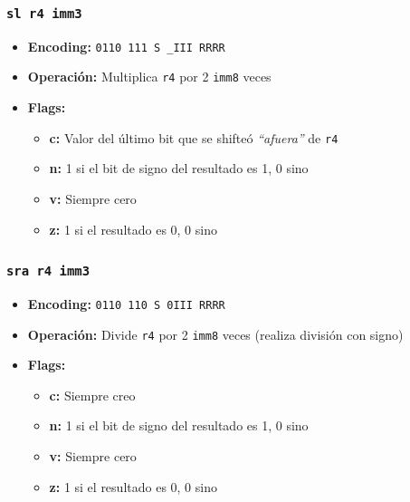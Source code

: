 \documentclass{article}
\begin{document}
\subsubsection{\texttt{sl r4 imm3}}
\begin{itemize}
    \item \textbf{Encoding:} \texttt{0110 111 S \_III RRRR}
    \item \textbf{Operación:} Multiplica \texttt{r4} por 2 \texttt{imm8} veces
    \item \textbf{Flags:}
        \begin{itemize}
            \item \textbf{c:} Valor del último bit que se shifteó \emph{``afuera''} de \texttt{r4}
            \item \textbf{n:} 1 si el bit de signo del resultado es 1, 0 sino
            \item \textbf{v:} Siempre cero
            \item \textbf{z:} 1 si el resultado es 0, 0 sino
        \end{itemize}
\end{itemize}
    
\subsubsection{\texttt{sra r4 imm3}}
\begin{itemize}
    \item \textbf{Encoding:} \texttt{0110 110 S 0III RRRR}
    \item \textbf{Operación:} Divide \texttt{r4} por 2 \texttt{imm8} veces (realiza división con signo)
    \item \textbf{Flags:}
        \begin{itemize}
            \item \textbf{c:} Siempre creo
            \item \textbf{n:} 1 si el bit de signo del resultado es 1, 0 sino
            \item \textbf{v:} Siempre cero
            \item \textbf{z:} 1 si el resultado es 0, 0 sino
        \end{itemize}
\end{itemize}
\end{document}
